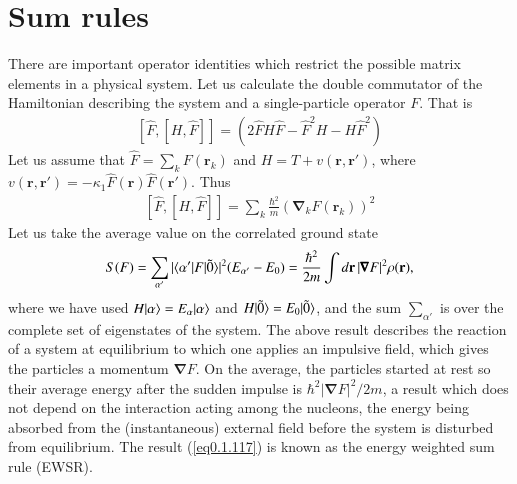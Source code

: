 \section{Sum rules}\label{Sect1.7}
There are important operator identities which restrict the possible matrix elements in a physical system. Let us calculate the double commutator of the Hamiltonian describing the system and a single-particle operator $F$. That is
\begin{align}\label{eq0.1.115}
\left[\hat F,\left[H,\hat F\right]\right]=\left(2\hat FH\hat F-\hat F^2H-H\hat F^2\right)
\end{align}
Let us assume that $\hat F=\sum_k F(\mathbf r_k)$ and $H=T+v(\mathbf r, \mathbf r')$, where $v(\mathbf r,\mathbf r')=-\kappa_1 \hat F(\mathbf r)\hat F(\mathbf r')$. Thus 
\begin{align}\label{eq0.1.116}
\left[\hat F,\left[H,\hat F\right]\right]=\sum_k\frac{\hbar^2}{m}\left(\pmb \nabla_kF(\mathbf r_k)\right)^2
\end{align}
Let us take the average value on the correlated ground state
\begin{align}\label{eq0.1.117}
S(F)=\sum_{\alpha'}|\langle {\alpha'|F|\tilde 0} \rangle|^2(E_{\alpha'}-E_0)=\frac{\hbar^2}{2m}\int d\mathbf r\, |\pmb\nabla F|^2\rho(\mathbf r),
\end{align}
where we have used $H|{\alpha} \rangle=E_\alpha|{\alpha} \rangle$ and $H|{\tilde 0} \rangle=E_0|{\tilde 0} \rangle$, and the sum $\sum_{\alpha'}$ is over the complete set of eigenstates of the system. The above result describes the reaction of a system at equilibrium to which one applies an impulsive field, which gives the particles a momentum $\pmb \nabla F$. On the average, the particles started at rest so their average energy after the sudden impulse is $\hbar^2|\pmb \nabla F|^2/2m$, a result which does not depend on the interaction acting among the nucleons, the energy being absorbed from the (instantaneous) external field before the system is disturbed from equilibrium. The result (\ref{eq0.1.117}) is known as the energy weighted sum rule (EWSR). 

